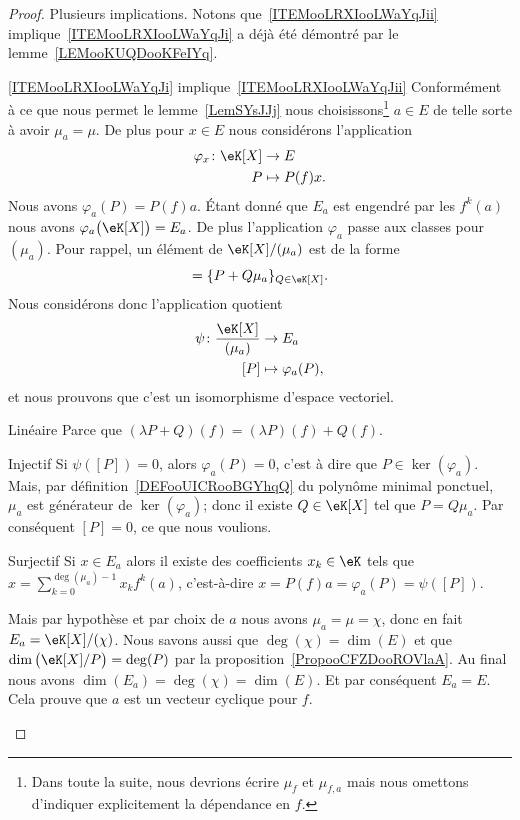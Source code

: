 \begin{proof}
	Plusieurs implications. Notons que~\ref{ITEMooLRXIooLWaYqJii} implique~\ref{ITEMooLRXIooLWaYqJi} a déjà été démontré par le lemme~\ref{LEMooKUQDooKFeIYq}.
	\begin{subproof}
		\item[\ref{ITEMooLRXIooLWaYqJi} implique~\ref{ITEMooLRXIooLWaYqJii}]
		Conformément à ce que nous permet le lemme~\ref{LemSYsJJj} nous choisissons\footnote{Dans toute la suite, nous devrions écrire \( \mu_f\) et \( \mu_{f,a}\) mais nous omettons d'indiquer explicitement la dépendance en \( f\).} \( a\in E\) de telle sorte à avoir \( \mu_a=\mu\). De plus pour \( x\in E\) nous considérons l'application
		\begin{equation}
			\begin{aligned}
				\varphi_x\colon \eK[X] & \to E          \\
				P                      & \mapsto P(f)x.
			\end{aligned}
		\end{equation}
		Nous avons \( \varphi_a(P)=P(f)a\). Étant donné que \( E_{a}\) est engendré par les \( f^k(a)\) nous avons \( \varphi_a\big( \eK[X] \big)=E_a\). De plus l'application \( \varphi_a\) passe aux classes pour \( (\mu_a)\). Pour rappel, un élément de \( \eK[X]/(\mu_a)\) est de la forme
		\begin{equation}
			[P]=\{ P+Q\mu_a \}_{Q\in \eK[X]}.
		\end{equation}
		Nous considérons donc l'application quotient
		\begin{equation}
			\begin{aligned}
				\psi\colon \frac{ \eK[X] }{ (\mu_a) } & \to E_a               \\
				[P]                                   & \mapsto \varphi_a(P),
			\end{aligned}
		\end{equation}
		et nous prouvons que c'est un isomorphisme d'espace vectoriel.
		\begin{subproof}
			\item[Linéaire]
			Parce que \( (\lambda P+Q)(f)=(\lambda P)(f)+Q(f)\).
			\item[Injectif]
			Si \( \psi([P])=0\), alors \( \varphi_a(P)=0\), c'est à dire que \( P\in \ker(\varphi_a)\).  Mais, par définition~\ref{DEFooUICRooBGYhqQ} du polynôme minimal ponctuel, \( \mu_a\) est générateur de \( \ker(\varphi_a)\); donc il existe \( Q\in \eK[X]\) tel que \( P=Q\mu_a\). Par conséquent \( [P]=0\), ce que nous voulions.
			\item[Surjectif]
			Si \( x\in E_a\) alors il existe des coefficients \( x_k\in \eK\) tels que \( x=\sum_{k=0}^{\deg(\mu_a)-1}x_kf^k(a)\), c'est-à-dire \( x=P(f)a=\varphi_a(P)=\psi([P])\).
		\end{subproof}
		Mais par hypothèse et par choix de \( a\) nous avons \( \mu_a=\mu=\chi\), donc en fait \( E_a=\eK[X]/(\chi)\). Nous savons aussi que \( \deg(\chi)=\dim(E)\) et que \( \dim\big( \eK[X]/P \big)=\deg(P)\) par la proposition~\ref{PropooCFZDooROVlaA}. Au final nous avons \( \dim(E_a)=\deg(\chi)=\dim(E)\). Et par conséquent \( E_a=E\). Cela prouve que \( a\) est un vecteur cyclique pour \( f\).


\end{subproof}
\end{proof}
